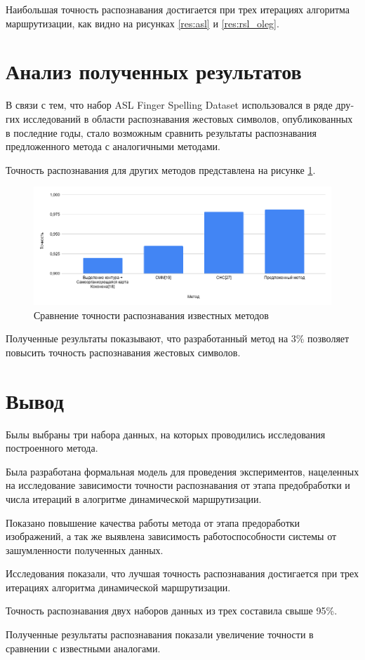 Наибольшая точность распознавания достигается при трех итерациях алгоритма маршрутизации, как видно на рисунках \ref{res:asl} и \ref{res:rsl_oleg}.

\section{Анализ полученных результатов}

В связи с тем, что набор ASL  Finger Spelling Dataset использовался в ряде дру­гих исследований в области распознавания жестовых символов, опуб­ликованных в последние годы, стало возможным сравнить результаты распознавания предложенного метода с аналогичными методами.

Точность распознавания для других методов представлена на ри­сунке \ref{res:compare}.

\begin{figure}[!h]
	\centering
	\includegraphics[width=\textwidth]{inc/img/compare}
	\caption{Сравнение точности распознавания известных методов}
	\label{res:compare}
\end{figure}

Полученные результаты показывают, что разработанный метод на 3\% позволяет повысить точность распознавания жестовых символов.

\section{Вывод}

Былы выбраны три набора данных, на которых проводились исследования построенного метода.

Была разработана формальная модель для проведения экспериментов, нацеленных на исследование зависимости точности распознавания от этапа предобработки и числа итераций в алогритме динамической маршрутизации.

Показано повышение качества работы метода от этапа предоработки изображений, а так же выявлена зависимость работоспособности системы от зашумленности полученных данных.

Исследования показали, что лучшая точность распознавания достигается при трех итерациях алгоритма динамической маршрутизации.

Точность распознавания двух наборов данных из трех составила свыше 95\%.

Полученные результаты распознавания показали увеличение точности в сравнении с известными аналогами.